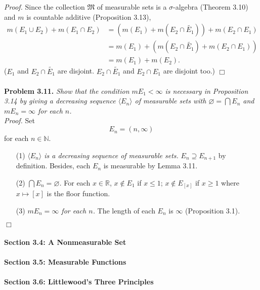 \documentclass{article}
\begin{document}
\emph{Proof.}
Since the collection $\mathfrak{M}$ of measurable sets is a $\sigma$-algebra
(Theorem 3.10) and $m$ is countable additive (Proposition 3.13),
\begin{align*}
m(E_1 \cup E_2) + m(E_1 \cap E_2)
& = \left( m(E_1) + m(E_2 \cap \widetilde{E_1}) \right) + m(E_2 \cap E_1) \\
& = m(E_1) + \left( m(E_2 \cap \widetilde{E_1}) + m(E_2 \cap E_1) \right) \\
& = m(E_1) + m(E_2).
\end{align*}
($E_1$ and $E_2 \cap \widetilde{E_1}$ are disjoint.
$E_2 \cap \widetilde{E_1}$ and $E_2 \cap E_1$ are disjoint too.)
$\Box$ \\\\



\textbf{Problem 3.11.}
\emph{Show that the condition $mE_1 < \infty$ is necessary in Proposition 3.14 by
giving a decreasing sequence $\langle E_n \rangle$ of measurable sets with
$\varnothing = \bigcap E_n$ and $mE_n = \infty$ for each $n$.} \\

\emph{Proof.}
Set $$E_n = (n, \infty)$$ for each $n \in \mathbb{N}$.
\begin{enumerate}
\item[(1)]
\emph{$\langle E_n \rangle$ is a decreasing sequence of measurable sets.}
$E_n \supseteq E_{n+1}$ by definition.
Besides, each $E_n$ is measurable by Lemma 3.11.
\item[(2)]
\emph{$\bigcap E_n = \varnothing$.}
For each $x \in \mathbb{R}$, $x \notin E_1$ if $x \leq 1$;
$x \notin E_{[x]}$ if $x \geq 1$ where $x \mapsto [x]$ is the floor function.
\item[(3)]
\emph{$mE_n = \infty$ for each $n$.}
The length of each $E_n$ is $\infty$ (Proposition 3.1).
\end{enumerate}

$\Box$ \\\\



\textbf{\large Section 3.4: A Nonmeasurable Set} \\\\



\textbf{\large Section 3.5: Measurable Functions} \\\\



\textbf{\large Section 3.6: Littlewood's Three Principles} \\\\
\end{document}

